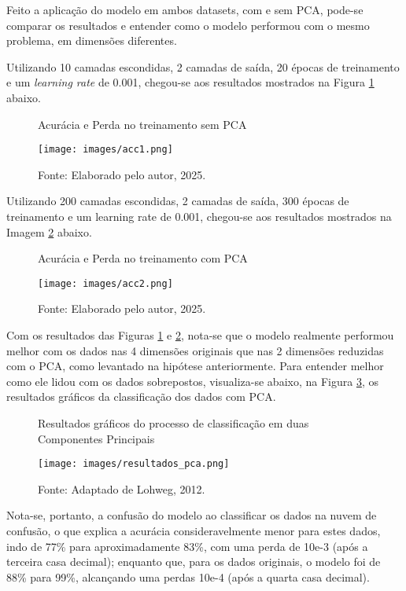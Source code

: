 \documentclass[12pt]{article}
\begin{document}
Feito a aplicação do modelo em ambos datasets, com e sem PCA, pode-se comparar os resultados e entender como o modelo performou com o mesmo problema, em dimensões diferentes.

Utilizando 10 camadas escondidas, 2 camadas de saída, 20 épocas de treinamento e um \textit{learning rate} de 0.001, chegou-se aos resultados mostrados na Figura \ref{fig:result1} abaixo.


\begin{figure}[H]
    \centering
    \caption{\fontsize{10}{12}\selectfont Acurácia e Perda no treinamento sem PCA}
    \texttt{[image: images/acc1.png]}
    \caption*{\fontsize{10}{12}\selectfont Fonte: Elaborado pelo autor, 2025.}
    \label{fig:result1}
\end{figure}


Utilizando 200 camadas escondidas, 2 camadas de saída, 300 épocas de treinamento e um learning rate de 0.001, chegou-se aos resultados mostrados na Imagem \ref{fig:result2} abaixo.

\begin{figure}[H]
    \centering
    \caption{\fontsize{10}{12}\selectfont Acurácia e Perda no treinamento com PCA}
    \texttt{[image: images/acc2.png]}
    \caption*{\fontsize{10}{12}\selectfont Fonte: Elaborado pelo autor, 2025.}
    \label{fig:result2}
\end{figure}

Com os resultados das Figuras \ref{fig:result1} e \ref{fig:result2}, nota-se que o modelo realmente performou melhor com os dados nas 4 dimensões originais que nas 2 dimensões reduzidas com o PCA, como levantado na hipótese anteriormente. Para entender melhor como ele lidou com os dados sobrepostos, visualiza-se abaixo, na Figura \ref{fig:result3}, os resultados gráficos da classificação dos dados com PCA.

\begin{figure}[H]
    \centering
    \caption{\fontsize{10}{12}\selectfont Resultados gráficos do processo de classificação em duas Componentes Principais}
    \texttt{[image: images/resultados\_pca.png]}
    \caption*{\fontsize{10}{12}\selectfont Fonte: Adaptado de Lohweg, 2012.}
    \label{fig:result3}
\end{figure}

Nota-se, portanto, a confusão do modelo ao classificar os dados na nuvem de confusão, o que explica a acurácia consideravelmente menor para estes dados, indo de 77\% para aproximadamente 83\%, com uma perda de 10e-3 (após a terceira casa decimal); enquanto que, para os dados originais, o modelo foi de 88\% para 99\%, alcançando uma perdas 10e-4 (após a quarta casa decimal).
\end{document}
